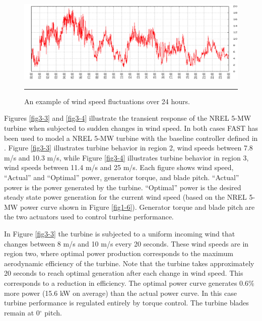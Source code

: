\begin{figure}[htbp]
	\centering
		\includegraphics[width=\linewidth]{Figures/ch3Figures/fig3-2.png}
		\rule{35em}{0.5pt}
	\caption{An example of wind speed fluctuations over 24 hours.\cite{NWTC2013}}
	\label{fig3-2}
\end{figure}

Figures  \ref{fig3-3} and  \ref{fig3-4} illustrate the transient response of the NREL 5-MW turbine when subjected to sudden changes in wind speed. In both cases FAST has been used to model a NREL 5-MW turbine with the baseline controller defined in \cite{jonkman2009}. Figure \ref{fig3-3} illustrates turbine behavior in region 2, wind speeds between 7.8 m/s and 10.3 m/s, while Figure \ref{fig3-4} illustrates turbine behavior in region 3, wind speeds between 11.4 m/s and 25 m/s.  Each figure shows wind speed, “Actual” and “Optimal” power, generator torque, and blade pitch. “Actual” power is the power generated by the turbine. “Optimal” power is the desired steady state power generation for the current wind speed (based on the NREL 5-MW power curve shown in Figure \ref{fig1-6}). Generator torque and blade pitch are the two actuators used to control turbine performance. 

In Figure \ref{fig3-3} the turbine is subjected to a uniform incoming wind that changes between 8 m/s and 10 m/s every 20 seconds. These wind speeds are in region two, where optimal power production corresponds to the maximum aerodynamic efficiency of the turbine. Note that the turbine takes approximately 20 seconds to reach optimal generation after each change in wind speed. This corresponds to a reduction in efficiency.  The optimal power curve generates 0.6\% more power (15.6 kW on average) than the actual power curve. In this case turbine performance is regulated entirely by torque control. The turbine blades remain at 0$^{\circ}$ pitch. 


